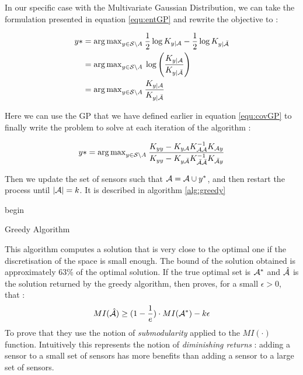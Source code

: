 In our specific case with the Multivariate Gaussian Distribution, we can take the formulation presented in equation \ref{equ:entGP} and rewrite the objective to : 

\begin{align}
    y*  &= {\arg \max}_{y \in \mathcal{S} \backslash A } \: \frac{1}{2} \log K_{y | \mathcal{A}} - \frac{1}{2} \log K_{y | \bar{\mathcal{A}}} \\
    &= {\arg \max}_{y \in \mathcal{S} \backslash A } \: \log \left(\frac{K_{y | \mathcal{A}}}{K_{y | \bar{\mathcal{A}}}} \right) \\
    &= {\arg \max}_{y \in \mathcal{S} \backslash A } \: \frac{K_{y | \mathcal{A}}}{K_{y | \bar{\mathcal{A}}}}
\end{align}

Here we can use the GP that we have defined earlier in equation \ref{equ:covGP} to finally write the problem to solve at each iteration of the algorithm : 

\begin{equation}
    y*  = {\arg \max}_{y \in \mathcal{S} \backslash A } \: \frac{K_{yy} - K_{y\mathcal{A}} K_{\mathcal{A}\mathcal{A}}^{-1} K_{\mathcal{A} y} }{K_{yy} - K_{y\bar{\mathcal{A}}} K_{\bar{\mathcal{A}}\bar{\mathcal{A}}}^{-1} K_{\bar{\mathcal{A}} y} } \label{equ:updateGreedy}
\end{equation}

Then we update the set of sensors such that $\mathcal{A} = \mathcal{A} \cup y^*$, and then restart the process until $|\mathcal{A}| = k$. It is described in algorithm \ref{alg:greedy}  \\

\begin{algorithm}[h]
 begin\;
 \caption{Greedy Algorithm}
 \label{alg:greedy}
\end{algorithm}


This algorithm computes a solution that is very close to the optimal one if the discretisation of the space is small enough. The bound of the solution obtained is approximately 63\% of the optimal solution. If the true optimal set is $\mathcal{A}^*$ and $\hat{\mathcal{A}}$ is the solution returned by the greedy algorithm, then \citet{krause_near-optimal_2008} proves, for a small $\epsilon >0 $, that : 
 \begin{equation}
    MI(\hat{\mathcal{A}}) \geq (1 - \frac{1}{e}) \cdot MI(\mathcal{A}^*) - k\epsilon
\end{equation}
To prove that they use the notion of \textit{submodularity} \citep{nemhauser_analysis_1978} applied to the $MI(\cdot)$ function. Intuitively this represents the notion of \textit{diminishing returns} :  adding a sensor to a small set of sensors has more benefits than adding a sensor to a large set of sensors. 


